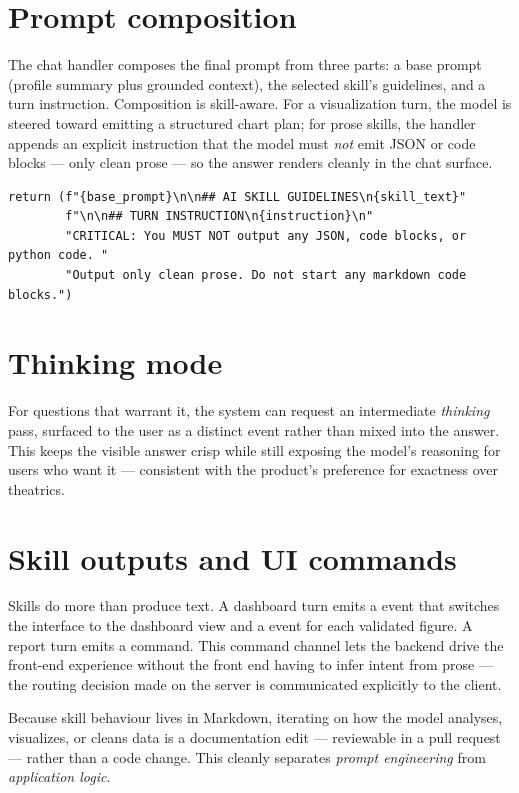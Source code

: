 \section{Prompt composition}
The chat handler composes the final prompt from three parts: a base prompt
(profile summary plus grounded context), the selected skill's guidelines, and a
turn instruction. Composition is skill-aware. For a visualization turn, the
model is steered toward emitting a structured chart plan; for prose skills, the
handler appends an explicit instruction that the model must \emph{not} emit JSON
or code blocks --- only clean prose --- so the answer renders cleanly in the
chat surface.

\begin{lstlisting}[style=py,caption={Prose skills forbid code/JSON output to keep answers clean.}]
return (f"{base_prompt}\n\n## AI SKILL GUIDELINES\n{skill_text}"
        f"\n\n## TURN INSTRUCTION\n{instruction}\n"
        "CRITICAL: You MUST NOT output any JSON, code blocks, or python code. "
        "Output only clean prose. Do not start any markdown code blocks.")
\end{lstlisting}

\section{Thinking mode}
For questions that warrant it, the system can request an intermediate
\emph{thinking} pass, surfaced to the user as a distinct  event
rather than mixed into the answer. This keeps the visible answer crisp while
still exposing the model's reasoning for users who want it --- consistent with
the product's preference for exactness over theatrics.

\section{Skill outputs and UI commands}
Skills do more than produce text. A dashboard turn emits a  event
that switches the interface to the dashboard view and a  event for
each validated figure. A report turn emits a  command.
This command channel lets the backend drive the front-end experience without the
front end having to infer intent from prose --- the routing decision made on the
server is communicated explicitly to the client.

\begin{uanote}
Because skill behaviour lives in Markdown, iterating on how the model analyses,
visualizes, or cleans data is a documentation edit --- reviewable in a pull
request --- rather than a code change. This cleanly separates \emph{prompt
engineering} from \emph{application logic}.
\end{uanote}
